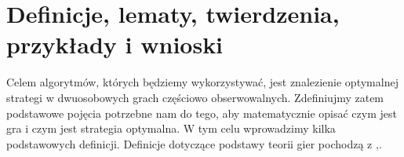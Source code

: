 \documentclass[inzynierska]{pwr_wmat_praca_dyplomowa}
\theoremstyle{plain}
\numberwithin{theorem}{chapter}
\theoremstyle{definition}
\numberwithin{theorem}{chapter}
\begin{document}
%
%
%
%
%
%                     


\chapter{Definicje, lematy, twierdzenia, przykłady i wnioski}
Celem algorytmów, których będziemy wykorzystywać, jest znalezienie optymalnej strategi w dwuosobowych grach częściowo obserwowalnych. Zdefiniujmy zatem podstawowe pojęcia potrzebne nam do tego, aby matematycznie opisać czym jest gra i czym jest strategia optymalna.
W tym celu wprowadzimy kilka podstawowych definicji.
Definicje dotyczące podstawy teorii gier  pochodzą z \cite{platkowski2012wstkep},\cite{prisner2014game}.
\end{document}
